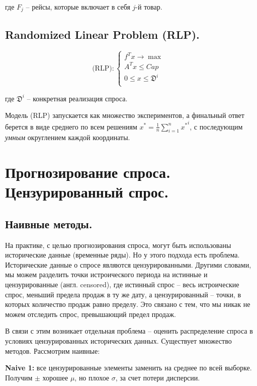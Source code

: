\documentclass[12pt, reqno]{article}
\theoremstyle{definition}
\theoremstyle{definition}
\theoremstyle{definition}
\theoremstyle{definition}
\theoremstyle{definition}
\theoremstyle{definition}
\theoremstyle{definition}
\theoremstyle{definition}
\theoremstyle{definition}
\begin{document}
		где $F_j$ -- рейсы, которые включает в себя $j$-й товар.
		
		\subsection{Randomized Linear Problem (RLP).}
		
		$$
		\text{(RLP)}:
		\begin{cases}
			f^Tx \rightarrow \max & \\
			A^Tx \leq Cap & \\
			0 \leq x \leq \mathfrak{D}^i & \\
		\end{cases}	
		$$
		
		где $\mathfrak{D}^i$ -- конкретная реализация спроса.
		
		Модель (RLP) запускается как множество экспериментов, а финальный ответ берется в виде среднего по всем решениям $x^* = \frac{1}{n}\sum\limits^n_{i = 1} {x^*}^i$, с последующим \textit{умным} округлением каждой координаты.
		
		
		
		\newpage
		\section{Прогнозирование спроса. Цензурированный спрос.}
		
		\subsection{Наивные методы.}
		
		На практике, с целью прогнозирования спроса, могут быть использованы исторические данные (временные ряды). Но у этого подхода есть проблема. Исторические данные о спросе являются цензурированными. Другими словами, мы можем разделить точки истроического периода на истинные и цензурированные (англ. censored), где истинный спрос -- весь истроические спрос, меньший предела продаж в ту же дату, а цензурированный -- точки, в которых количество продаж равно пределу. Это связано с тем, что мы никак не можем отследить спрос, превышающий предел продаж.
		
		В связи с этим возникает отдельная проблема -- оценить распределение спроса в условиях цензурированных исторических данных. Существует множество методов. Рассмотрим наивные:
		
		\textbf{Naive 1:} все цензурированные элементы заменить на среднее по всей выборке. Получим $\pm$ хорошее $\mu$, но плохое $\sigma$, за счет потери дисперсии.
		
\end{document}
